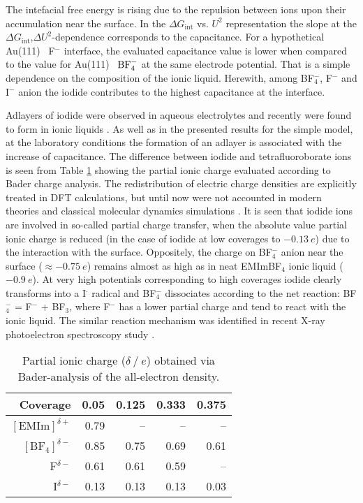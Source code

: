 \documentclass[a4paper,10pt]{article}
\begin{document}
The intefacial free energy is rising due to the repulsion between ions upon their accumulation near the surface. In the $\Delta G_\mathrm{int}$ vs. $U^2$ representation the slope at the $\Delta G_\mathrm{int}$,$\Delta U^2$-dependence corresponds to the capacitance. For a hypothetical Au(111) \textbar~F$^-$ interface, the evaluated capacitance value is lower when compared to the value for Au(111) \textbar~$\textnormal{BF}_4^-$ at the same electrode potential. That is a simple dependence on the composition of the ionic liquid. Herewith, among BF$_4^-$, F$^-$ and I$^-$ anion the iodide contributes to the highest capacitance at the interface.

Adlayers of iodide were observed in aqueous electrolytes and recently were found to form in ionic liquids \cite{Siinor2013}. As well as in the presented results for the simple model, at the laboratory conditions the formation of an adlayer is associated with the increase of capacitance. The difference between iodide and tetrafluoroborate ions is seen from Table \ref{tab:charges} showing the partial ionic charge evaluated according to Bader charge analysis. The redistribution of electric charge densities are explicitly treated in DFT calculations, but until now were not accounted in modern theories and classical molecular dynamics simulations \cite{dommert2012}. It is seen that iodide ions are involved in so-called partial charge transfer, when the absolute value partial ionic charge is reduced (in the case of iodide at low coverages to $-0.13\ e$) due to the interaction with the surface. Oppositely, the charge on BF$_4^-$ anion near the surface ($\approx -0.75\ e$) remains almost as high as in neat EMImBF$_4$ ionic liquid ($-0.9\ e$). At very high potentials corresponding to high coverages iodide clearly transforms into a I$^{\cdot}$ radical and BF$_4^-$ dissociates according to the net reaction: BF$_4^-$ = F$^-$ + BF$_3$, where F$^-$ has a lower partial charge and tend to react with the ionic liquid. The similar reaction mechanism was identified in recent X-ray photoelectron spectroscopy study \cite{Tonisoo2013}.

\begin{table}
\begin{center}
\begin{tabular}{ r r r r r }
\hline
Coverage			& 0.05		& 0.125   	& 0.333		& 0.375	\\
\hline
$[ \mathrm{EMIm} ] ^{\delta+}$	& 0.79		& --		& --		& --	\\
$[ \mathrm{BF}_4 ] ^{\delta-}$	& 0.85		& 0.75		& 0.69		& 0.61	\\
F$^{\delta-}$			& 0.61		& 0.61		& 0.59		& --	\\
I$^{\delta-}$			& 0.13		& 0.13		& 0.13		& 0.03	\\
\end{tabular}
\end{center}
  \caption{Partial ionic charge ($\delta\ /\ e$) obtained via Bader-analysis of the all-electron density.}
  \label{tab:charges}
\end{table}
\end{document}
